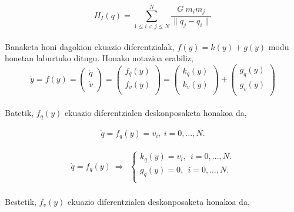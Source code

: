 \begin{equation}
H_I(q)=\sum\limits_{1\leq i < j \leq N}^{N} \frac{G \ m_i m_j}{\|q_j-q_i\|}
\end{equation}

\paragraph*{}Banaketa honi dagokion ekuazio diferentzialak,  $f(y)=k(y)+g(y)$ modu honetan laburtuko ditugu. Honako notazioa erabiliz,
\begin{equation*}
\dot{y}=f(y)=
\left(\begin{array}{c}
  \dot{q} \\
  \dot{v} \\
\end{array}\right)=
\left(\begin{array}{c}
  f_q(y) \\
  f_v(y) \\
\end{array}\right)=
\left(\begin{array}{c}
  k_q(y) \\
  k_v(y) \\
\end{array}\right)+
\left(\begin{array}{c}
  g_q(y) \\
  g_v(y) \\
\end{array}\right)
\end{equation*}

\paragraph*{}Batetik, $f_q(y)$ ekuazio diferentzialen deskonposaketa honakoa da,

\begin{align*}
\dot{q}=f_q(y)=v_i,  \ i=0,\dots,N. 
\end{align*}

\begin{align}
\dot{q}=f_q(y) \ \Rightarrow \ \ 
\left \{ \begin{array}{c}
  k_q(y) =v_i, \ \ i=0,\dots,N. \\[.25cm]
  g_q(y) =0,\ \ i=0,\dots,N.\\
\end{array} \right.  
\end{align}

\paragraph*{}Bestetik, $f_v(y)$ ekuazio diferentzialen deskonposaketa honakoa da,

